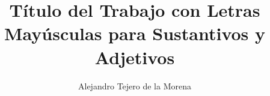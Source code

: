 \documentclass[a4paper, 12pt]{book}
\title{Título del Trabajo con Letras Mayúsculas para Sustantivos y Adjetivos}
\author{Alejandro Tejero de la Morena}
\begin{document}
\renewcommand{\refname}{Bibliografía}  %
\renewcommand{\appendixname}{Apéndice}









\tableofcontents 

\cleardoublepage

\listoffigures %



















\cleardoublepage


%


\end{document}
